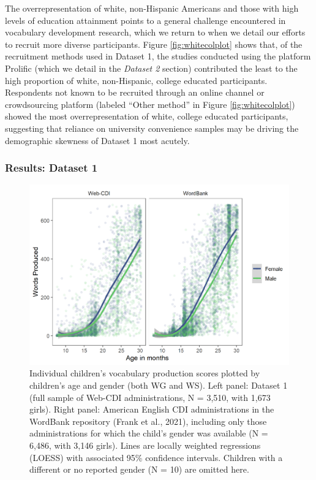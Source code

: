 \documentclass[
  english,
  ,man,floatsintext]{apa6}
\begin{document}
The overrepresentation of white, non-Hispanic Americans and those with high levels of education attainment points to a general challenge encountered in vocabulary development research, which we return to when we detail our efforts to recruit more diverse participants. Figure \ref{fig:whitecolplot} shows that, of the recruitment methods used in Dataset 1, the studies conducted using the platform Prolific (which we detail in the \emph{Dataset 2} section) contributed the least to the high proportion of white, non-Hispanic, college educated participants. Respondents not known to be recruited through an online channel or crowdsourcing platform (labeled ``Other method'' in Figure \ref{fig:whitecolplot}) showed the most overrepresentation of white, college educated participants, suggesting that reliance on university convenience samples may be driving the demographic skewness of Dataset 1 most acutely.

\hypertarget{results-dataset-1}{%
\subsubsection{Results: Dataset 1}\label{results-dataset-1}}

\begin{figure}
\centering
\includegraphics{webcdi_paper_files/figure-latex/genderfig-1.pdf}
\caption{\label{fig:genderfig}Individual children's vocabulary production scores plotted by children's age and gender (both WG and WS). Left panel: Dataset 1 (full sample of Web-CDI administrations, N = 3,510, with 1,673 girls). Right panel: American English CDI administrations in the WordBank repository (Frank et al., 2021), including only those administrations for which the child's gender was available (N = 6,486, with 3,146 girls). Lines are locally weighted regressions (LOESS) with associated 95\% confidence intervals. Children with a different or no reported gender (N = 10) are omitted here.}
\end{figure}
\end{document}
